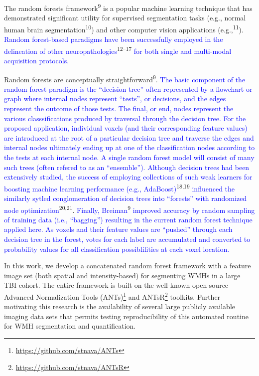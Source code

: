 \documentclass[11pt,]{article}
\let\rmarkdownfootnote\footnote%
\def\footnote{\protect\rmarkdownfootnote}
\begin{document}
The random forests framework\textsuperscript{9} is a popular machine
learning technique that has demonstrated significant utility for
supervised segmentation tasks (e.g., normal human brain
segmentation\textsuperscript{10}) and other computer vision applications
(e.g.,\textsuperscript{11}).
\textcolor{blue}{Random forest-based paradigms have been successfully employed in the
delineation of other neuropathologies}\textsuperscript{12--17}
\textcolor{blue}{for both single and multi-modal acquisition protocols.}

Random forests are conceptually straightforward\textsuperscript{9}.
\textcolor{blue}{The basic component of
the random forest paradigm is the ``decision tree'' often represented by a flowchart or
graph where internal nodes represent ``tests'', or decisions, and the edges represent the outcome of those tests.  The final, or end, nodes represent the various classsifications produced by traversal through the decision tree.  For the proposed application, individual
voxels (and their corresponding feature values) are introduced at the root of a particular
decision tree and traverse the edges and internal nodes ultimately ending up at one of
the classification nodes according to the tests at each internal node.  A single random
forest model will consist of many such trees (often refered to as an ``ensemble'').}
\textcolor{blue}{Although decision trees had been extensively studied, the success of employing collections of such weak learners for boosting machine learning performance
(e.g., AdaBoost)}\textsuperscript{18,19}
\textcolor{blue}{influenced the similarly sytled conglomeration of decision trees into ``forests'' with randomized node optimization}\textsuperscript{20,21}.
\textcolor{blue}{Finally, Breiman}\textsuperscript{9}
\textcolor{blue}{improved accuracy by random sampling of training data (i.e., ``bagging'') resulting
in the current random forest technique applied here.}
\textcolor{blue}{As voxels and their feature values are ``pushed'' through each decision tree in the forest,  votes for each label are accumulated and converted to probability values for all classification possiblilities at
each voxel location.}

In this work, we develop a concatenated random forest framework with a
feature image set (both spatial and intensity-based) for segmenting WMHs
in a large TBI cohort. The entire framework is built on the well-known
open-source Advanced Normalization Tools (ANTs)\footnote{\url{https://github.com/stnava/ANTs}}
and ANTsR\footnote{\url{https://github.com/stnava/ANTsR}} toolkits.
Further motivating this research is the availability of several large
publicly available imaging data sets that permits testing
reproducibility of this automated routine for WMH segmentation and
quantification.
\end{document}

